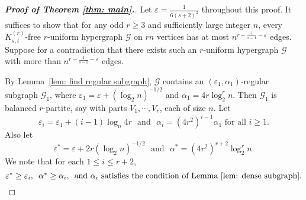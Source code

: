 \documentclass[11pt]{article}
\begin{document}
\begin{proof}[\bf Proof of Theorem \ref{thm: main}.]
Let $\varepsilon= \frac{1}{6(s+2)^2}$ throughout this proof. It suffices to show that for any odd $r\geq 3$ and sufficiently large integer $n$,
every $K_{s,t}^{(r)}$-free $r$-uniform hypergraph $\mathcal G$ on $rn$ vertices has at most $n^{r-\frac{1}{s-1}-\varepsilon }$ edges.
Suppose for a contradiction that there exists such an $r$-uniform hypergraph $\mathcal G$ with more than $n^{r-\frac{1}{s-1}-\varepsilon }$ edges.

By Lemma~\ref{lem: find regular subgraph}, $\mathcal G$ contains an $\left(\varepsilon_1,\alpha_1\right)$-regular subgraph $\mathcal G_1$, where $\varepsilon_1=\varepsilon +(\log_2n)^{-1/2}$ and $\alpha_1=4r\log_2^r n$.
Then $\mathcal G_1$ is balanced $r$-partite, say with parts $V_1,\cdots, V_r$, each of size $n$.
Let $$\varepsilon_i=\varepsilon_1+(i-1)\log_{n}4r \mbox{ ~and~ } \alpha_i=(4r^2)^{i-1}\alpha_1 \mbox{ for all } i\geq 1.$$
Also let $$\varepsilon^*=\varepsilon+2r(\log_2 n)^{-1/2} \mbox{ ~and~ } \alpha^*=(4r^2)^{r+2}\log_2^r n.$$
We note that for each $1\leq i\leq r+2$,
\begin{equation}\label{equ:alpha*}
\mbox{$\varepsilon^*\geq \varepsilon_i$, ~$\alpha^*\geq \alpha_i$, ~and $\alpha_i$ satisfies the condition of Lemma~\ref{lem: dense subgraph}.}
\end{equation}


\end{proof}
\end{document}
